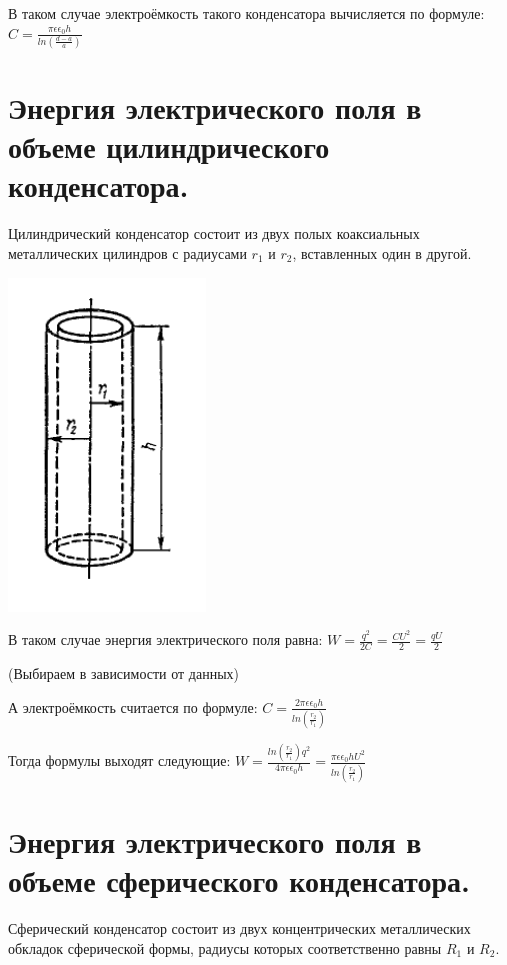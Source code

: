 \documentclass[12pt]{report}
\begin{document}
В таком случае электроёмкость такого конденсатора вычисляется по формуле: $C = \frac{\pi \epsilon \epsilon_0 h}{ln(\frac{d - a}{a})}$

\section{Энергия электрического поля в объеме цилиндрического конденсатора.}

Цилиндрический конденсатор состоит из двух полых коаксиальных металлических цилиндров с радиусами $r_1$ и $r_2$, вставленных один в другой.

\begin{center}
    \includegraphics{graphics/t15.PNG}
\end{center}

В таком случае энергия электрического поля равна: $W = \frac{q^2}{2C} = \frac{C U^2}{2} = \frac{qU}{2}$

(Выбираем в зависимости от данных)

А электроёмкость считается по формуле: $C = \frac{2 \pi \epsilon \epsilon_0 h}{ln(\frac{r_2}{r_1})}$

Тогда формулы выходят следующие: $W = \frac{ln(\frac{r_2}{r_1}) q^2}{4 \pi \epsilon \epsilon_0 h} = \frac{\pi \epsilon \epsilon_0 h U^2}{ln(\frac{r_2}{r_1})}$

\section{Энергия электрического поля в объеме сферического конденсатора.}

Сферический конденсатор состоит из двух концентрических металлических обкладок сферической формы, радиусы которых соответственно равны $R_1$ и $R_2$.
\end{document}
